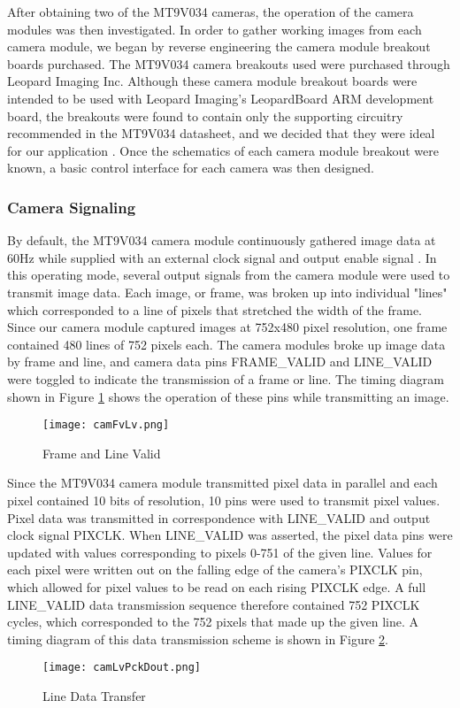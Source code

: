 \par
After obtaining two of the MT9V034 cameras, the operation of the camera modules was then investigated. In order to gather working images from each camera module, we began by reverse engineering the camera module breakout boards purchased. The MT9V034 camera breakouts used were purchased through Leopard Imaging Inc. Although these camera module breakout boards were intended to be used with Leopard Imaging's LeopardBoard ARM development board, the breakouts were found to contain only the supporting circuitry recommended in the MT9V034 datasheet, and we decided that they were ideal for our application \cite{livm34lp,mt9v034}. Once the schematics of each camera module breakout were known, a basic control interface for each camera was then designed.
\subsubsection{Camera Signaling}
By default, the MT9V034 camera module continuously gathered image data at 60Hz while supplied with an external clock signal and output enable signal \cite{mt9v034}. In this operating mode, several output signals from the camera module were used to transmit image data. Each image, or frame, was broken up into individual "lines" which corresponded to a line of pixels that stretched the width of the frame. Since our camera module captured images at 752x480 pixel resolution, one frame contained 480 lines of 752 pixels each. The camera modules broke up image data by frame and line, and camera data pins FRAME\_VALID and LINE\_VALID were toggled to indicate the transmission of a frame or line. The timing diagram shown in Figure \ref{FvLv} shows the operation of these pins while transmitting an image.

\begin{figure}[H]
	\centerline{\texttt{[image: camFvLv.png]}}
	\caption{Frame and Line Valid \cite{mt9v034}}
	\label{FvLv}
\end{figure}

\par
Since the MT9V034 camera module transmitted pixel data in parallel and each pixel contained 10 bits of resolution, 10 pins were used to transmit pixel values. Pixel data was transmitted in correspondence with LINE\_VALID and output clock signal PIXCLK. When LINE\_VALID was asserted, the pixel data pins were updated with values corresponding to pixels 0-751 of the given line. Values for each pixel were written out on the falling edge of the camera's PIXCLK pin, which allowed for pixel values to be read on each rising PIXCLK edge. A full LINE\_VALID data transmission sequence therefore contained 752 PIXCLK cycles, which corresponded to the 752 pixels that made up the given line. A timing diagram of this data transmission scheme is shown in Figure \ref{LvDout}.  
\begin{figure}[H]
	\centerline{\texttt{[image: camLvPckDout.png]}}
	\caption{Line Data Transfer \cite{mt9v034}}
	\label{LvDout}
\end{figure}

